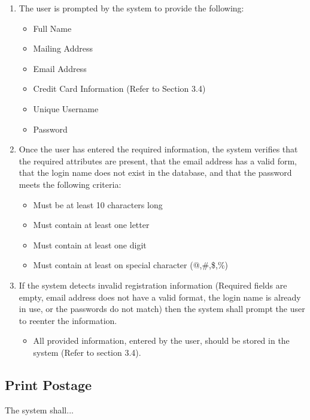 \documentclass{scrreprt}
\begin{document}
\begin{enumerate}
\item The user is prompted by the system to provide the following:
\begin{itemize}
\item Full Name
\item Mailing Address
\item Email Address
\item Credit Card Information (Refer to Section 3.4)
\item Unique Username
\item Password
\end{itemize}
\item Once the user has entered the required information, the system verifies
that the required attributes are present, that the email address has a valid
form, that the login name does not exist in the database, and that the password
meets the following criteria:
\begin{itemize}
\item Must be at least 10 characters long
\item Must contain at least one letter
\item Must contain at least one digit
\item Must contain at least on special character (@,\#,\$,\%)
\end{itemize}
\item If the system detects invalid registration information (Required fields
are empty, email address does not have a valid format, the login name is
already in use, or the passwords do not match) then the system shall prompt the
user to reenter the information.  
\begin{itemize}
\item All provided information, entered by the user, should be stored in the
system (Refer to section 3.4).
\end{itemize}
\end{enumerate}

\subsection{Print Postage}

The system shall...
\end{document}
